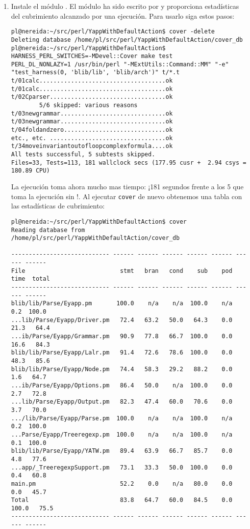 \begin{enumerate}
\item
Instale el módulo 
.
El módulo   ha sido
escrito por
 y proporciona 
estadísticas del cubrimiento alcanzado por una ejecución.
Para usarlo siga estos pasos:
\begin{verbatim}
pl@nereida:~/src/perl/YappWithDefaultAction$ cover -delete
Deleting database /home/pl/src/perl/YappWithDefaultAction/cover_db
pl@nereida:~/src/perl/YappWithDefaultAction$ HARNESS_PERL_SWITCHES=-MDevel::Cover make test
PERL_DL_NONLAZY=1 /usr/bin/perl "-MExtUtils::Command::MM" "-e" "test_harness(0, 'blib/lib', 'blib/arch')" t/*.t
t/01calc....................................ok 
t/01calc....................................ok
t/02Cparser.................................ok
        5/6 skipped: various reasons
t/03newgrammar..............................ok 
t/03newgrammar..............................ok
t/04foldandzero.............................ok
etc., etc. .................................ok
t/34moveinvariantoutofloopcomplexformula....ok
All tests successful, 5 subtests skipped.
Files=33, Tests=113, 181 wallclock secs (177.95 cusr +  2.94 csys = 180.89 CPU)
\end{verbatim}
La ejecución toma ahora mucho mas tiempo: ¡181 segundos frente a los 5 que toma la ejecución sin !.
Al ejecutar \verb|cover| de nuevo obtenemos una tabla con las estadísticas
de cubrimiento:

\begin{verbatim}
pl@nereida:~/src/perl/YappWithDefaultAction$ cover
Reading database from /home/pl/src/perl/YappWithDefaultAction/cover_db

---------------------------- ------ ------ ------ ------ ------ ------ ------
File                           stmt   bran   cond    sub    pod   time  total
---------------------------- ------ ------ ------ ------ ------ ------ ------
blib/lib/Parse/Eyapp.pm       100.0    n/a    n/a  100.0    n/a    0.2  100.0
...lib/Parse/Eyapp/Driver.pm   72.4   63.2   50.0   64.3    0.0   21.3   64.4
...ib/Parse/Eyapp/Grammar.pm   90.9   77.8   66.7  100.0    0.0   16.6   84.3
blib/lib/Parse/Eyapp/Lalr.pm   91.4   72.6   78.6  100.0    0.0   48.3   85.6
blib/lib/Parse/Eyapp/Node.pm   74.4   58.3   29.2   88.2    0.0    1.6   64.7
...ib/Parse/Eyapp/Options.pm   86.4   50.0    n/a  100.0    0.0    2.7   72.8
...lib/Parse/Eyapp/Output.pm   82.3   47.4   60.0   70.6    0.0    3.7   70.0
.../lib/Parse/Eyapp/Parse.pm  100.0    n/a    n/a  100.0    n/a    0.2  100.0
...Parse/Eyapp/Treeregexp.pm  100.0    n/a    n/a  100.0    n/a    0.1  100.0
blib/lib/Parse/Eyapp/YATW.pm   89.4   63.9   66.7   85.7    0.0    4.8   77.6
...app/_TreeregexpSupport.pm   73.1   33.3   50.0  100.0    0.0    0.4   60.8
main.pm                        52.2    0.0    n/a   80.0    0.0    0.0   45.7
Total                          83.8   64.7   60.0   84.5    0.0  100.0   75.5
---------------------------- ------ ------ ------ ------ ------ ------ ------


\end{verbatim}
\end{enumerate}
